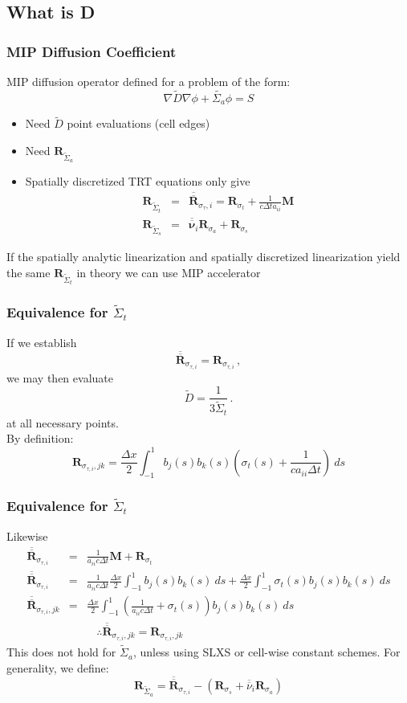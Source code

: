 \documentclass{beamer}
\newcommand{\be}{\begin{equation*}}   %
\newcommand{\ee}{\end{equation*}}
\newcommand{\bea}{\begin{eqnarray*}}  %
\newcommand{\eea}{\end{eqnarray*}}
\newcommand{\B}[1]{\ensuremath{b_{#1} }}			%
\newcommand{\R}[1]{\ensuremath{\mathbf{R}_{#1}}}
\newcommand{\M}{\ensuremath{ \mathbf M}}
\newcommand{\pec}{\, ,}
\newcommand{\pep}{\, .}
\begin{document}
\subsection{What is D}
\begin{frame}
\frametitle{MIP Diffusion Coefficient}
MIP diffusion operator defined for a problem of the form:
\be
\nabla \widetilde{D} \nabla \phi + \widetilde{\Sigma_a} \phi = S
\ee
\vspace{-0.2in}
\begin{itemize}
\item Need $\widetilde{D}$ point evaluations (cell edges)
\item Need $\R{\widetilde{\Sigma}_a}$
\item Spatially discretized TRT equations only give
\bea
\R{\widetilde{\Sigma}_t} &=& \overline{\overline{\mathbf R}}_{\sigma_{\tau},i} = \R{\sigma_t} + \frac{1}{c\Delta t a_{ii}}\M \\
\R{\widetilde{\Sigma}_s} &=& \overline{\overline{\mathbf \nu}}_i \R{\sigma_a} + \R{\sigma_s}
\eea
\end{itemize}
If  the spatially analytic linearization and spatially discretized linearization yield the same $\R{\widetilde{\Sigma}_t}$ in theory we can use MIP accelerator

\end{frame}

\begin{frame}
\frametitle{Equivalence for $\widetilde{\Sigma}_t$}
If we establish 
\be
\overline{\overline{\mathbf R}}_{\sigma_{\tau,i}} = \R{\sigma_{\tau,i}} \pec
\ee
we may then evaluate
\be
\widetilde{D} = \frac{1}{3\widetilde{\Sigma}_t} \pep
\ee
at all necessary points.
\\
\vspace{0.2in}
By definition:
\be
\R{\sigma_{\tau,i},jk} = \frac{\Delta x}{2} \int_{-1}^{1}{\B{j}(s) \B{k}(s) \left( \sigma_t(s) + \frac{1}{c a_{ii} \Delta t}  \right)~ds}
\ee
\end{frame}

\begin{frame}
\frametitle{Equivalence for $\widetilde{\Sigma}_t$}
Likewise
\bea
\overline{\overline{\mathbf R}}_{\sigma_{\tau,i}} &=& \frac{1}{a_{ii} c \Delta t} \M + \R{\sigma_t} \\
\overline{\overline{\mathbf R}}_{\sigma_{\tau,i}} &=& \frac{1}{a_{ii} c \Delta t} \frac{\Delta x}{2} \int_{-1}^1{\B{j}(s) \B{k}(s) ~ds} + \frac{\Delta x}{2} \int_{-1}^1{ \sigma_t(s) \B{j}(s) \B{k}(s)~ds} \\
\overline{\overline{\mathbf R}}_{\sigma_{\tau,i},jk} &=& \frac{\Delta x}{2} \int_{-1}^1{ \left(\frac{1}{a_{ii} c \Delta t} + \sigma_t(s)  \right) \B{j}(s) \B{k}(s)~ds} \\
& & ~~~~ \therefore  \overline{\overline{\mathbf R}}_{\sigma_{\tau,i},jk} = \R{\sigma_{\tau,i},jk}
\eea
This does not hold for $\widetilde{\Sigma}_a$, unless using SLXS or cell-wise constant schemes.  For generality, we define:
\be
\R{\widetilde{\Sigma}_a} = \overline{\overline{\mathbf R}}_{\sigma_{\tau,i}}  - \left( \R{\sigma_s} + \overline{\overline{\nu}}_i \R{\sigma_a} \right) 
\ee
\end{frame}
\end{document}
